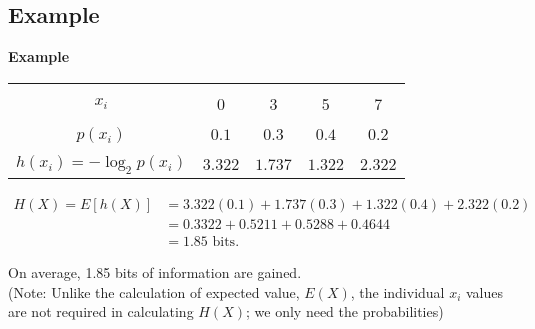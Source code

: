\documentclass[compress]{beamer}        %
\makeatletter
\newcommand{\tcb}{\textcolor{beamer@blendedblue}}
\makeatother
\begin{document}
\subsection{Example}
\begin{frame}{\bf \tcb{Example}}

\begin{center}
\begin{tabular}{|c|cccc|}
\hline
&&&&\\[-0.3cm]
$x_i$ & 0 & 3 & 5 & 7 \\[0.1cm]
\hline
&&&&\\[-0.3cm]
$p(x_i)$ & $0.1$ & $0.3$ & $0.4$ & $0.2$ \\[0.1cm]
\hline
&&&&\\[-0.3cm]
$h(x_i) = -\log_2 p(x_i)$ & $3.322$ & $1.737$ & $1.322$ & $2.322$ \\[0.1cm]
\hline
\end{tabular}
\end{center}


\begin{align*}
H(X) = E[h(X)] &= 3.322(0.1)+1.737(0.3)+1.322(0.4)+2.322(0.2) \\[0.2cm]
&= 0.3322 + 0.5211 + 0.5288 + 0.4644 \\[0.2cm]
&= 1.85 \text{ bits}.
\end{align*}

On average, 1.85 bits of information are gained.\\[0.4cm]

{\footnotesize(Note: Unlike the calculation of expected value, $E(X)$, the individual $x_i$ values are not required in calculating $H(X)$; we only need the probabilities)}

\end{frame}
\end{document}
